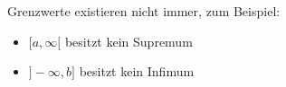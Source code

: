 Grenzwerte existieren nicht immer, zum Beispiel:

\begin{itemize}
    \item $[a, \infty[$ besitzt kein Supremum
    \item $]-\infty, b]$ besitzt kein Infimum
\end{itemize}
